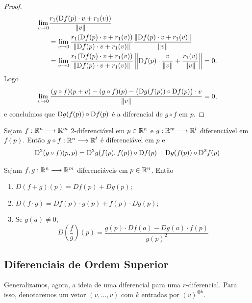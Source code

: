 \begin{proof}
\begin{align*}
	\lim_{v \rightarrow 0} &\frac{r_1(\mathrm{D} f(p) \cdot v + r_1(v))}{\left\Vert{v}\right\Vert} \\
		&= \lim_{v \rightarrow 0} \frac{r_1(\mathrm{D} f(p) \cdot v + r_1(v))}{\left\Vert{\mathrm{D}f(p) \cdot v + r_1(v)}\right\Vert} \frac{\left\Vert{\mathrm{D}f(p) \cdot v + r_1(v)}\right\Vert}{\left\Vert{v}\right\Vert}\\
		&= \lim_{v \rightarrow 0} \frac{r_1(\mathrm{D} f(p) \cdot v + r_1(v))}{\left\Vert{\mathrm{D}f(p) \cdot v + r_1(v)}\right\Vert} \left\Vert{\mathrm{D}f(p) \cdot \frac{v}{\left\Vert{v}\right\Vert}+ \frac{r_1(v)}{\left\Vert{v}\right\Vert}}\right\Vert = 0.
	\end{align*}
Logo
	\begin{equation*}
	\lim_{v \rightarrow 0} \frac{(g \circ f)(p+v) - (g \circ f)(p) - \big(\mathrm{D} g(f(p)) \circ \mathrm{D} f(p)\big) \cdot v}{\left\Vert{v}\right\Vert} = 0,
	\end{equation*}
e concluímos que $\mathrm{D} g(f(p)) \circ \mathrm{D} f(p)$ é a diferencial de $g \circ f$ em $p$.
\end{proof}


\begin{prop}
Sejam $f: \mathbb{R}^n \longrightarrow \mathbb{R}^m$ $2$-diferenciável em $p \in \mathbb{R}^n$ e $g: \mathbb{R}^m \longrightarrow \mathbb{R}^l$ diferenciável em $f(p)$. Então $g \circ f: \mathbb{R}^n \longrightarrow \mathbb{R}^l$ é diferenciável em $p$ e
	\begin{equation*}
	\mathrm{D}^2 (g \circ f)(p,p) = \mathrm{D}^2 g(f(p),f(p)) \circ \mathrm{D} f(p) + \mathrm{D} g(f(p)) \circ \mathrm{D}^2 f(p)
	\end{equation*}
\end{prop}




\begin{prop}
	Sejam $f,g: \mathbb{R}^n \longrightarrow \mathbb{R}^m$ diferenciáveis em $p \in \mathbb{R}^n$. Então
	\begin{enumerate}
	\item $D (f+g)(p) = D f(p) + D g(p);$
	\item $D (f \cdot g) = D f(p) \cdot g(p) + f(p) \cdot D g(p);$
	\item Se $g(a) \neq 0$,
	\begin{equation*}
	D \left(\frac{f}{g}\right) (p) = \frac{g(p) \cdot D f(a) - D g (a) \cdot f(p)}{g(p)^2}
	\end{equation*}
	\end{enumerate}
\end{prop}



\subsection{Diferenciais de Ordem Superior}

Generalizamos, agora, a ideia de uma diferencial para uma $r$-diferencial. Para isso, denotaremos um vetor $(v,\ldots,v)$ com $k$ entradas por $(v)^{\otimes k}$.

